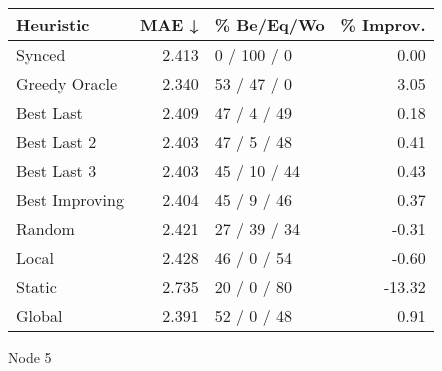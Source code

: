 \begin{tabular}{lrlr}
\toprule
\textbf{Heuristic} & \textbf{MAE ↓} & \textbf{\% Be/Eq/Wo} & \textbf{\% Improv.} \\
\midrule
            Synced &          2.413 &          0 / 100 / 0 &                0.00 \\
     Greedy Oracle &          2.340 &          53 / 47 / 0 &                3.05 \\
         Best Last &          2.409 &          47 / 4 / 49 &                0.18 \\
       Best Last 2 &          2.403 &          47 / 5 / 48 &                0.41 \\
       Best Last 3 &          2.403 &         45 / 10 / 44 &                0.43 \\
    Best Improving &          2.404 &          45 / 9 / 46 &                0.37 \\
            Random &          2.421 &         27 / 39 / 34 &               -0.31 \\
             Local &          2.428 &          46 / 0 / 54 &               -0.60 \\
            Static &          2.735 &          20 / 0 / 80 &              -13.32 \\
            Global &          2.391 &          52 / 0 / 48 &                0.91 \\
\bottomrule
\end{tabular}
\caption{Node 5}
\label{tab:ds_iid_lr05_le2_bs4_5}
